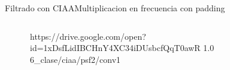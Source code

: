 \begin{frame}[t]{Filtrado con CIAA}{Multiplicacion en frecuencia con padding}
   \protoboardicon
   \begin{columns}[c]
      \hspace{2pt}
      \begin{column}{.3\textwidth}
         
      \end{column}
      \hspace{2pt}
      \vrule
      \hspace{2pt}
      \begin{column}{.3\textwidth}
         
      \end{column}
      \hspace{2pt}
      \vrule
      \hspace{2pt}
      \begin{column}{.4\textwidth}
         {https://drive.google.com/open?id=1xDsfLidIBCHnY4XC34iDUsbcfQqT0awR}
         {1.0}
         {6_clase/ciaa/psf2/conv1}
      \end{column}
      \hspace{2pt}
   \end{columns}
   \vfill
\end{frame}
